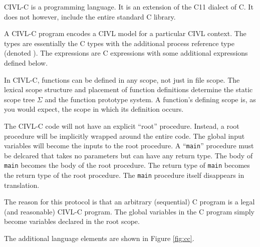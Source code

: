 \documentclass[11pt]{article}
\begin{document}



CIVL-C is a programming language.   It is an extension of the C11
dialect of C.  It does not however, include the entire standard
C library.

A CIVL-C program encodes a CIVL model for a particular CIVL context. The
types are essentially the C types with the additional process reference
type (denoted \cproc).  The expressions are C expressions with 
some additional expressions defined below.

In CIVL-C, functions can be defined in any scope, not just in file
scope.  The lexical scope structure and placement of function
definitions determine the static scope tree $\Sigma$ and the function
prototype system.  A function's defining scope is, as you would
expect, the scope in which its definition occurs.

The CIVL-C code will not have an explicit ``root'' procedure.
Instead, a root procedure will be implicitly wrapped around the entire
code.  The global input variables will become the inputs to the root
procedure.  A ``\texttt{main}'' procedure must be delcared that takes
no parameters but can have any return type.  The body of \texttt{main}
becomes the body of the root procedure.  The return type of
\texttt{main} becomes the return type of the root procedure.  The
\texttt{main} procedure itself disappears in translation.

The reason for this protocol is that an arbitrary (sequential) C program
is a legal (and reasonable) CIVL-C program.  The global variables in the
C program simply become variables declared in the root scope.

The additional language elements are shown in Figure \ref{fig:cc}.
\end{document}
